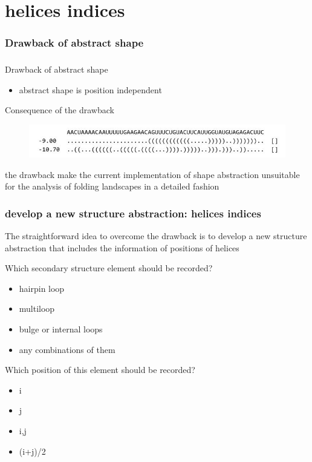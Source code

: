 \documentclass[ignorenonframetext,10pt]{beamer}
\begin{document}
\section{helices indices}
\frametitle{Drawback of abstract shape}
\begin{frame}
\frametitle{}
   \begin{block}{\small Drawback of abstract shape}
   \begin{itemize} 
   \item abstract shape is position independent
   \end{itemize}
   \end{block}
   \begin{block}{\small Consequence of the drawback}
   \begin{figure}
     \includegraphics[scale=0.55]{images/drawback_1.jpg} 
   \end{figure}
   \end{block}   
   the drawback make the current implementation of shape abstraction unsuitable for the analysis of folding landscapes in a detailed fashion
\end{frame}


\begin{frame}
\frametitle{develop a new structure abstraction: helices indices}
    The straightforward idea to overcome the drawback is to develop a new structure abstraction that includes the information of positions of helices
    \begin{block}{Which secondary structure element should be recorded?}
    \begin{itemize} 
    \item hairpin loop
    \item multiloop
    \item bulge or internal loops
    \item any combinations of them
    \end{itemize}
    \end{block}
    \begin{block}{Which position of this element should be recorded?}
    \begin{itemize} 
    \item i
    \item j   
    \item i,j
    \item (i+j)/2
    \end{itemize}    
    \end{block}
\end{frame}
\end{document}
